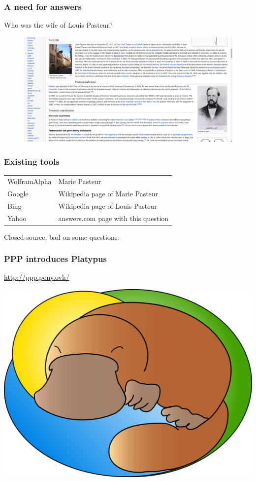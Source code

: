 \begin{frame}[fragile]
    \frametitle{A need for answers}
    Who was the wife of Louis Pasteur?
    \begin{figure}
        \includegraphics[width=\textwidth]{pasteurWiki.png}
    \end{figure}
\end{frame}

\begin{frame}[fragile]
    \frametitle{Existing tools}
    \begin{tabular}{ll}
        WolframAlpha & Marie Pasteur\\
        Google & Wikipedia page of Marie Pasteur\\
        Bing & Wikipedia page of Louis Pasteur\\
        Yahoo & answers.com page with this question
    \end{tabular}
\medbreak
\alert{Closed-source, bad on some questions.}
\end{frame}

\begin{frame}[fragile]
    \frametitle{PPP introduces Platypus}
    \begin{center}
        \url{http://ppp.pony.ovh/}
        
        \bigskip
        
        \includegraphics[width=0.6\linewidth]{figures/platypus.png}
    \end{center}
\end{frame}

